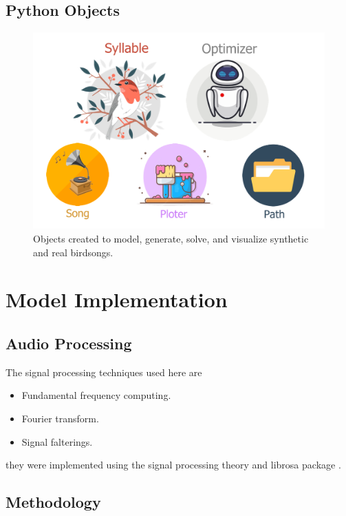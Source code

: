 \subsection{Python Objects}

\begin{figure}[H]
    \centering
    \includegraphics[scale=0.85]{Images/objects.png}
    \caption{Objects created to model, generate, solve, and  visualize synthetic and real birdsongs.}
    \label{fig:objects}
\end{figure}

\section{Model Implementation}

\subsection{Audio Processing}

The signal processing techniques used here are 
\begin{itemize}
    \item Fundamental frequency computing.
    \item Fourier transform.
    \item Signal falterings.
\end{itemize}

they were implemented using the signal processing theory and librosa package \cite{librosa, signal_book_modern}.

\subsection{Methodology}

